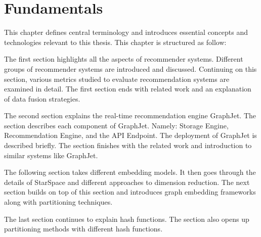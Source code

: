 \chapter{Fundamentals}

This chapter defines central terminology and introduces essential concepts and technologies relevant to this thesis. This chapter is structured as follow:

The first section highlights all the aspects of recommender systems. Different groups of recommender systems are introduced and discussed. Continuing on this section, various metrics studied to evaluate recommendation systems are examined in detail. The first section ends with related work and an explanation of data fusion strategies.


The second section explains the real-time recommendation engine GraphJet. The section describes each component of GraphJet. Namely: Storage Engine, Recommendation Engine, and the API Endpoint. The deployment of GraphJet is described briefly. The section finishes with the related work and introduction to similar systems like GraphJet.


The following section takes different embedding models. It then goes through the details of StarSpace and different approaches to dimension reduction. The next section builds on top of this section and introduces graph embedding frameworks along with partitioning techniques.


The last section continues to explain hash functions. The section also opens up partitioning methods with different hash functions.
